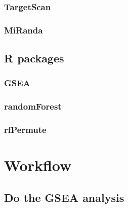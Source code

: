 \documentclass{scrartcl}
\begin{document}

\subsubsection{TargetScan}


\subsubsection{MiRanda}


\subsection{R packages}


\subsubsection{GSEA}


\subsubsection{randomForest}


\subsubsection{rfPermute}


\section{Workflow}

\subsection{Do the GSEA analysis}

\end{document}
